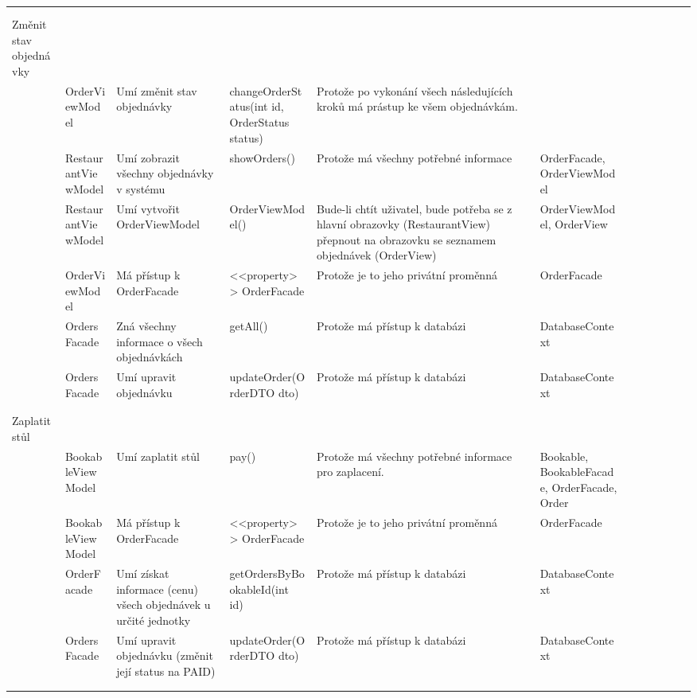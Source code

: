 \begin{landscape}
\begin{longtable}{ Lp{2cm} | Lp{3.5cm} | Lp{3cm} | Lp{4cm} | Lp{4cm} | Lp{4cm} }
    & & & & & \\
    & & & & & \\
    
    Změnit stav objednávky & & & & & \\
    \hline
    & OrderViewModel & Umí změnit stav objednávky & changeOrderStatus(int id, OrderStatus status) & Protože po vykonání všech následujících kroků má prástup ke všem objednávkám. & \\
    & RestaurantViewModel & Umí zobrazit všechny objednávky v systému & showOrders() & Protože má všechny potřebné informace & OrderFacade, OrderViewModel \\
    & RestaurantViewModel & Umí vytvořit OrderViewModel & OrderViewModel() & Bude-li chtít uživatel, bude potřeba se z hlavní obrazovky (RestaurantView) přepnout na obrazovku se seznamem objednávek (OrderView) & OrderViewModel, OrderView \\
    & OrderViewModel & Má přístup k OrderFacade & <<property>> OrderFacade & Protože je to jeho privátní proměnná & OrderFacade \\
    & OrdersFacade & Zná všechny informace o všech objednávkách & getAll() & Protože má přístup k databázi & DatabaseContext\\
    & OrdersFacade & Umí upravit objednávku & updateOrder(OrderDTO dto) & Protože má přístup k databázi & DatabaseContext\\
    & & & & & \\
    & & & & & \\
    
    Zaplatit stůl & & & & & \\
    \hline
    & BookableViewModel & Umí zaplatit stůl & pay() & Protože má všechny potřebné informace pro zaplacení. & Bookable, BookableFacade, OrderFacade, Order \\
    & BookableViewModel & Má přístup k OrderFacade & <<property>> OrderFacade & Protože je to jeho privátní proměnná & OrderFacade \\
    & OrderFacade & Umí získat informace (cenu) všech objednávek u určité jednotky & getOrdersByBookableId(int id) & Protože má přístup k databázi & DatabaseContext \\
    & OrdersFacade & Umí upravit objednávku (změnit její status na PAID) & updateOrder(OrderDTO dto) & Protože má přístup k databázi & DatabaseContext\\
    & & & & & \\
    & & & & & \\
    

\end{longtable}
\end{landscape}

